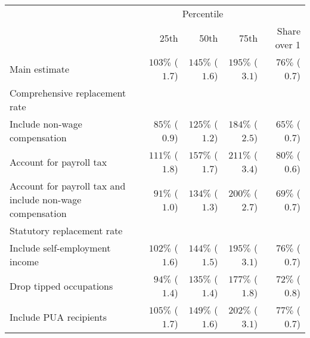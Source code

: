 \captionsetup[table]{labelformat=empty,skip=1pt}
\begin{tabular}{lrrrr}
\toprule
& \multicolumn{3}{c}{Percentile} & \\ 
 \cmidrule(lr){2-4}
 & 25th & 50th & 75th & Share over 1 \\ 
\midrule
Main estimate & $103\%$ ($1.7$)  & $145\%$ ($1.6$)  & $195\%$ ($3.1$)  & $76\%$ ($0.7$)  \\ 
\midrule
\multicolumn{1}{l}{Comprehensive replacement rate} \\\hspace{0.5cm} Include non-wage compensation & $85\%$ ($0.9$)  & $125\%$ ($1.2$)  & $184\%$ ($2.5$)  & $65\%$ ($0.7$)  \\ 
\hspace{0.5cm} Account for payroll tax & $111\%$ ($1.8$)  & $157\%$ ($1.7$)  & $211\%$ ($3.4$)  & $80\%$ ($0.6$)  \\ 
\hspace{0.5cm} Account for payroll tax and include non-wage compensation & $91\%$ ($1.0$)  & $134\%$ ($1.3$)  & $200\%$ ($2.7$)  & $69\%$ ($0.7$)  \\ 
\midrule
\multicolumn{1}{l}{Statutory replacement rate} \\\hspace{0.5cm} Include self-employment income & $102\%$ ($1.6$)  & $144\%$ ($1.5$)  & $195\%$ ($3.1$)  & $76\%$ ($0.7$)  \\ 
\hspace{0.5cm} Drop tipped occupations & $94\%$ ($1.4$)  & $135\%$ ($1.4$)  & $177\%$ ($1.8$)  & $72\%$ ($0.8$)  \\ 
\hspace{0.5cm} Include PUA recipients & $105\%$ ($1.7$)  & $149\%$ ($1.6$)  & $202\%$ ($3.1$)  & $77\%$ ($0.7$)  \\ 
\bottomrule
\end{tabular}

